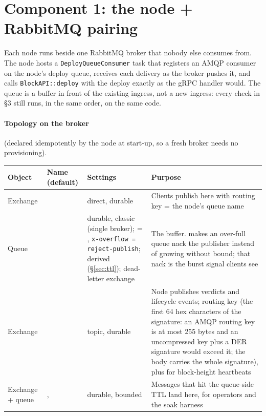 \documentclass[11pt]{article}
\newcommand{\code}[1]{\texttt{#1}}
\begin{document}
\section{Component 1: the node + RabbitMQ pairing}
\label{sec:node}

Each node runs beside one RabbitMQ broker that nobody else consumes from. The node
hosts a \code{DeployQueueConsumer} task that registers an AMQP consumer on the node's
deploy queue, receives each delivery as the broker pushes it, and calls
\code{BlockAPI::deploy} with the deploy exactly as the gRPC handler would. The queue
is a buffer in front of the existing ingress, not a new ingress: every check in \S3
still runs, in the same order, on the same code.

\paragraph{Topology on the broker} (declared idempotently by the node at start-up, so
a fresh broker needs no provisioning).
\begin{center}\small
\begin{tabularx}{\textwidth}{L{1.6cm} L{3.6cm} X X}
\toprule
Object & Name (default) & Settings & Purpose \\
\midrule
Exchange &  & direct, durable & Clients publish here with routing key = the node's queue name \\
Queue &  & durable, classic (single broker);  = , \code{x-overflow = reject-publish};  derived (\S\ref{sec:ttl}); dead-letter exchange  & The buffer.  makes an over-full queue nack the publisher instead of growing without bound; that nack is the burst signal clients see \\
Exchange &  & topic, durable & Node publishes verdicts and lifecycle events; routing key  (the first 64 hex characters of the signature: an AMQP routing key is at most 255 bytes and an uncompressed key plus a DER signature would exceed it; the body carries the whole signature), plus  for block-height heartbeats \\
Exchange + queue & ,  & durable, bounded & Messages that hit the queue-side TTL land here, for operators and the soak harness \\
\bottomrule
\end{tabularx}
\end{center}
\end{document}
